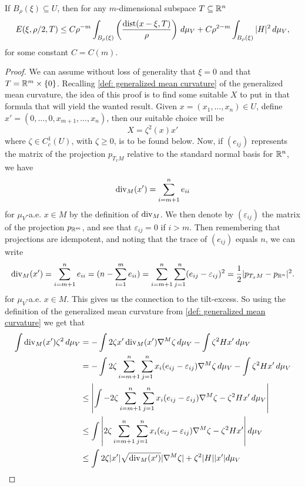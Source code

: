 \begin{lemma}\label{lem: before holder}
If $B_{\rho}(\xi) \subseteq U$, then for any $m$-dimensional subspace $T \subseteq \mathbb{R}^n$
\[
    E(\xi, \rho/2, T) \le C\rho^{-m} \int_{B_{\rho}(\xi)} \left( \frac{\operatorname{dist}(x-\xi, T)}{\rho} \right) \, d\mu_V + C\rho^{2-m} \int_{B_{\rho}(\xi)} |H|^2 \, d\mu_V,
\]
for some constant $C=C(m)$.
\end{lemma}
\begin{proof}
We can assume without loss of generality that $\xi = 0$ and that $T=\mathbb{R}^m \times \{0\}$. Recalling \cref{def: generalized mean curvature} of the generalized mean curvature, the idea of this proof is to find some suitable $X$ to put in that formula that will yield the wanted result. Given $x=(x_1,\dots, x_n) \in U$, define $x'=(0, \dots, 0,x_{m+1}, \dots, x_n)$, then our suitable choice will be
\[
    X = \zeta^2(x)x'
\]
where $\zeta \in C_c^1(U)$, with $\zeta \ge 0$, is to be found below.
Now, if $(e_{ij})$ represents the matrix of the projection $p_{T_xM}$ relative to the standard normal basis for $\mathbb{R}^n$, we have
\[
    \operatorname{div}_M(x') = \sum_{i=m+1}^{n} e_{ii}
\]
for $\mu_V$-a.e. $x \in M$ by the definition of $\operatorname{div}_M$.
We then denote by $(\varepsilon_{ij})$ the matrix of the projection $p_{\mathbb{R}^m}$, and see that $\varepsilon_{ij}=0$ if $i>m$. Then remembering that projections are idempotent, and noting that the trace of $(e_{ij})$ equals $n$, we can write
\[
    \operatorname{div}_M(x')= \sum_{i=m+1}^n e_{ii}=(n - \sum_{i=1}^{m} e_{ii})=\sum_{i=m+1}^{n}\sum_{j=1}^{n}(e_{ij} - \varepsilon_{ij})^2=\frac{1}{2}|p_{T_xM} - p_{\mathbb{R}^n}|^2.
\]
for $\mu_V$-a.e. $x \in M$. This gives us the connection to the tilt-excess.
So using the definition of the generalized mean curvature from \cref{def: generalized mean curvature} we get that
\begin{align*}
    \int \Div_M(x')\zeta^2 \, d\mu_V &= -\int 2\zeta x'\Div_M(x') \nabla^M \zeta \, d\mu_V - \int \zeta^2 H x' \, d\mu_V \\
    &= -\int 2\zeta \sum_{i=m+1}^{n}\sum_{j=1}^{n}x_i(e_{ij} - \varepsilon_{ij})\nabla^M \zeta \, d\mu_V - \int \zeta^2 H x' \, d\mu_V \\
    &\le \left| \int - 2\zeta \sum_{i=m+1}^{n}\sum_{j=1}^{n}x_i(e_{ij} - \varepsilon_{ij})\nabla^M \zeta - \zeta^2 H x' \, d\mu_V \right| \\
   &\le \int \left| 2\zeta \sum_{i=m+1}^{n}\sum_{j=1}^{n}x_i(e_{ij} - \varepsilon_{ij})\nabla^M \zeta - \zeta^2 H x' \right| d\mu_V \\
   &\le \int 2\zeta |x'| \sqrt{\Div_M(x')}|\nabla^M \zeta| + \zeta^2 |H| |x'| d\mu_V \\

\end{align*}
\end{proof}
